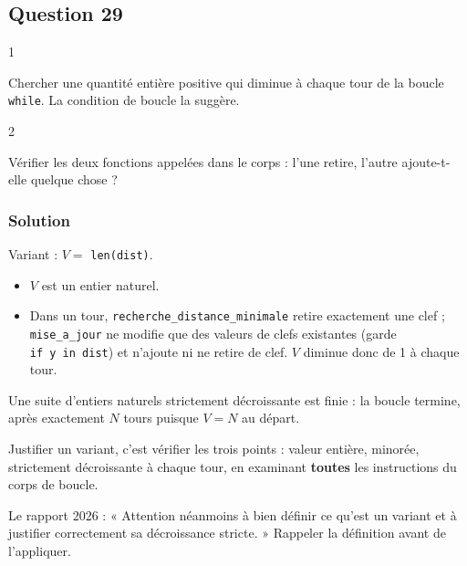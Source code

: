 \documentclass[11pt,a4paper]{article}
\providecommand{\tightlist}{\setlength{\itemsep}{0pt}\setlength{\parskip}{0pt}}
\begin{document}
\hypertarget{question-29}{%
\subsection{Question 29}\label{question-29}}

\begin{indication}{1}

Chercher une quantité entière positive qui diminue à chaque tour de la boucle \texttt{while}. La condition de boucle la suggère.

\end{indication}

\begin{indication}{2}

Vérifier les deux fonctions appelées dans le corps : l'une retire, l'autre ajoute-t-elle quelque chose ?

\end{indication}

\hypertarget{solution-28}{%
\subsubsection{Solution}\label{solution-28}}

Variant : \(V =\) \texttt{len(dist)}.

\begin{itemize}
\tightlist
\item
  \(V\) est un entier naturel.
\item
  Dans un tour, \texttt{recherche\_distance\_minimale} retire exactement une clef ; \texttt{mise\_a\_jour} ne modifie que des valeurs de clefs existantes (garde \texttt{if\ y\ in\ dist}) et n'ajoute ni ne retire de clef. \(V\) diminue donc de 1 à chaque tour.
\end{itemize}

Une suite d'entiers naturels strictement décroissante est finie : la boucle termine, après exactement \(N\) tours puisque \(V = N\) au départ.

\begin{methode}

Justifier un variant, c'est vérifier les trois points : valeur entière, minorée, strictement décroissante à chaque tour, en examinant \textbf{toutes} les instructions du corps de boucle.

\end{methode}

\begin{jury}

Le rapport 2026 : « Attention néanmoins à bien définir ce qu'est un variant et à justifier correctement sa décroissance stricte. » Rappeler la définition avant de l'appliquer.

\end{jury}
\end{document}

